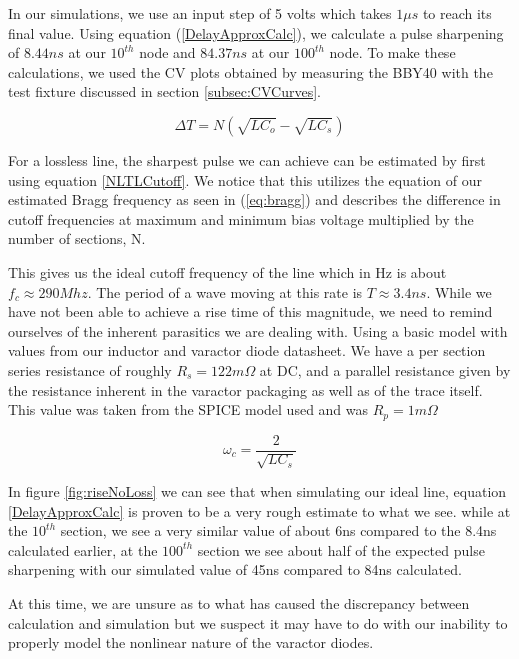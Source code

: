 \documentclass[journal]{IEEEtran} \usepackage[english]{babel}
\begin{document}
In our simulations, we use an input step of 5 volts which takes $1\mu s$ to reach
its final value. Using equation (\ref{DelayApproxCalc}), we calculate a pulse
sharpening of $8.44ns$ at our $10^{th}$ node and $84.37ns$ at our $100^{th}$
node. To make these calculations, we used the CV plots obtained by measuring the
BBY40 with the test fixture discussed in section \ref{subsec:CVCurves}.


\begin{equation} \label{DelayApproxCalc}
    \Delta T = N(\sqrt{LC_{o}} - \sqrt{LC_{s}} )
\end{equation}

For a lossless line, the sharpest pulse we can achieve can be estimated by first
using equation \ref{NLTLCutoff}\cite{wilson1991pulse}.
We notice that this utilizes the equation of our estimated Bragg frequency as
seen in (\ref{eq:bragg}) and describes the difference in cutoff
frequencies at maximum and minimum bias voltage multiplied by the number of
sections, N. 

 This gives us the ideal cutoff frequency of the line which in Hz is about $f_c
 \approx 290Mhz$. The period of a wave moving at this rate is $T \approx 3.4ns$.
 While we have not been able to achieve a rise time of this magnitude, we need to remind ourselves of the inherent parasitics we are dealing with. Using a
 basic model
with values from our inductor and varactor diode datasheet. We have a per
section series resistance of roughly $R_s = 122m\Omega$ at DC, and a parallel
resistance given by the resistance inherent in the varactor packaging as well as
of the trace itself. This value was taken from the SPICE model used and was
$R_{p} = 1m\Omega$



\begin{equation} \label{NLTLCutoff}
    \omega_{c} = \frac{2}{\sqrt{ LC_{s} } }
\end{equation}

In figure \ref{fig:riseNoLoss} we can see that when simulating our ideal line,
equation \ref{DelayApproxCalc} is proven to be a very rough estimate to what we
see. while at the $10^{th}$ section, we see a very similar value of about 6ns
compared to the 8.4ns calculated earlier, at the $100^{th}$ section we see about
half of the expected pulse sharpening with our simulated value of 45ns compared
to 84ns calculated.

At this time, we are unsure as to what has caused the discrepancy between
calculation and simulation but we suspect it may have to do with our inability
to properly model the nonlinear nature of the varactor diodes.
\end{document}
